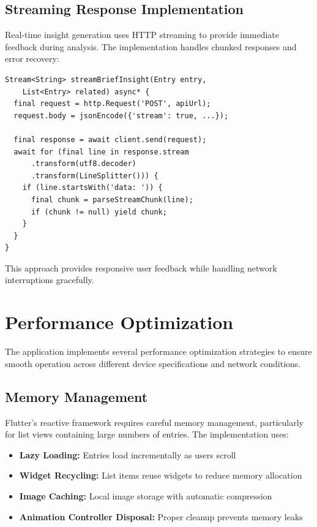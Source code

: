 \documentclass[conference]{IEEEtran}
\begin{document}
\subsection{Streaming Response Implementation}

Real-time insight generation uses HTTP streaming to provide immediate feedback during analysis. The implementation handles chunked responses and error recovery:

\begin{verbatim}
Stream<String> streamBriefInsight(Entry entry, 
    List<Entry> related) async* {
  final request = http.Request('POST', apiUrl);
  request.body = jsonEncode({'stream': true, ...});
  
  final response = await client.send(request);
  await for (final line in response.stream
      .transform(utf8.decoder)
      .transform(LineSplitter())) {
    if (line.startsWith('data: ')) {
      final chunk = parseStreamChunk(line);
      if (chunk != null) yield chunk;
    }
  }
}
\end{verbatim}

This approach provides responsive user feedback while handling network interruptions gracefully.

\section{Performance Optimization}

The application implements several performance optimization strategies to ensure smooth operation across different device specifications and network conditions.

\subsection{Memory Management}

Flutter's reactive framework requires careful memory management, particularly for list views containing large numbers of entries. The implementation uses:

\begin{itemize}
\item \textbf{Lazy Loading:} Entries load incrementally as users scroll
\item \textbf{Widget Recycling:} List items reuse widgets to reduce memory allocation
\item \textbf{Image Caching:} Local image storage with automatic compression
\item \textbf{Animation Controller Disposal:} Proper cleanup prevents memory leaks
\end{itemize}
\end{document}
